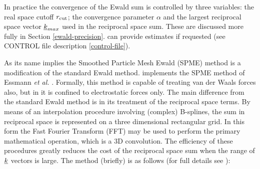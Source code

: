 In practice the convergence of the Ewald sum is controlled by
three variables: the real space cutoff $r_{\rm cut}$; the convergence
parameter $\alpha$ and the largest reciprocal space vector
$\mbox{$\underline{k}$}_{max}$ used in the reciprocal space sum.  These are
discussed more fully in Section \ref{ewald-precision}.  \D can
provide estimates if requested (see CONTROL file description
\ref{control-file}).

As its name implies the Smoothed Particle Mesh Ewald (SPME)
 method is a modification of the standard Ewald
method.  \D implements the SPME method of Essmann {\em et al.}
\cite{essmann-95a}.  Formally, this method is capable of treating
van der Waals forces also, but in \D it is confined to
electrostatic forces only.  The main difference from the standard
Ewald method is in its treatment of the reciprocal space
terms.  By means of an interpolation procedure involving (complex)
B-splines, the sum in reciprocal space is represented on a three
dimensional rectangular grid.  In this form the Fast Fourier
Transform (FFT) may be used to perform the primary mathematical
operation, which is a 3D convolution.  The efficiency of these
procedures greatly reduces the cost of the reciprocal space sum
when the range of $\mbox{$\underline{k}$}$ vectors is large.  The method
(briefly) is as follows (for full details see \cite{essmann-95a}):

